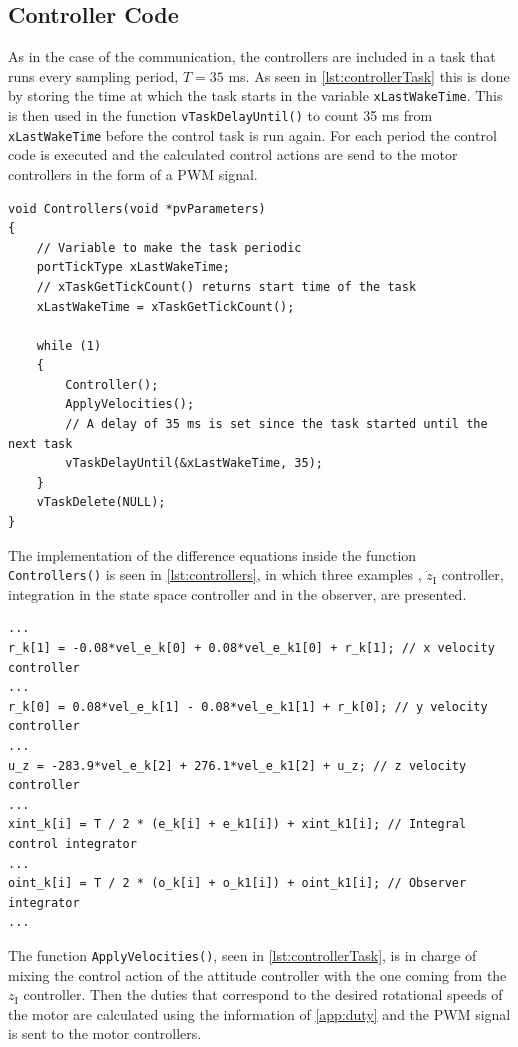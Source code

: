 \subsection{Controller Code}
As in the case of the communication, the controllers are included in a task that runs every sampling period, $T = 35$ \si{ms}. As seen in \autoref{lst:controllerTask} this is done by storing the time at which the task starts in the variable \lstinline[style=customcppinline]{xLastWakeTime}. This is then used in the function \lstinline[style=customcppinline]{vTaskDelayUntil()} to count 35 ms from \lstinline[style=customcppinline]{xLastWakeTime} before the control task is run again. For each period the control code is executed and the calculated control actions are send to the motor controllers in the form of a PWM signal.



\begin{lstlisting}[style=customcpp,
caption={Code for the controller task.}, 
label=lst:controllerTask]
void Controllers(void *pvParameters)
{ 
	// Variable to make the task periodic
	portTickType xLastWakeTime;
	// xTaskGetTickCount() returns start time of the task
	xLastWakeTime = xTaskGetTickCount();
	
	while (1)
	{
		Controller();
		ApplyVelocities();
		// A delay of 35 ms is set since the task started until the next task
		vTaskDelayUntil(&xLastWakeTime, 35);
	}
	vTaskDelete(NULL);
}
\end{lstlisting}

The implementation of the difference equations inside the function \lstinline[style=customcppinline]{Controllers()} is seen in \autoref{lst:controllers}, in which three examples , $\dot{z}_{\mathrm{I}}$ controller, integration in the state space controller and in the observer, are presented.

\begin{lstlisting}[style=customcpp,
caption={Code for the controllers.}, 
label=lst:controllers]
...
r_k[1] = -0.08*vel_e_k[0] + 0.08*vel_e_k1[0] + r_k[1]; // x velocity controller
...
r_k[0] = 0.08*vel_e_k[1] - 0.08*vel_e_k1[1] + r_k[0]; // y velocity controller
...
u_z = -283.9*vel_e_k[2] + 276.1*vel_e_k1[2] + u_z; // z velocity controller
...
xint_k[i] = T / 2 * (e_k[i] + e_k1[i]) + xint_k1[i]; // Integral control integrator
...
oint_k[i] = T / 2 * (o_k[i] + o_k1[i]) + oint_k1[i]; // Observer integrator
...

\end{lstlisting}

The function \lstinline[style=customcppinline]{ApplyVelocities()}, seen in \autoref{lst:controllerTask}, is in charge of mixing the control action of the attitude controller with the one coming from the $z_{\mathrm{I}}$ controller. Then the duties that correspond to the desired rotational speeds of the motor are calculated using the information of \autoref{app:duty} and the PWM signal is sent to the motor controllers.












